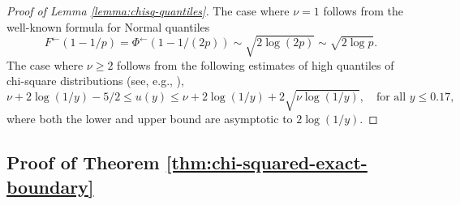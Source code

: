\begin{proof}[Proof of Lemma \ref{lemma:chisq-quantiles}]
The case where $\nu=1$ follows from the well-known formula for Normal quantiles 
$$
F^\leftarrow(1 - 1/p) = \Phi^\leftarrow(1-1/(2p))\sim\sqrt{2\log{(2p)}}\sim\sqrt{2\log{p}}.
$$
The case where $\nu\ge2$ follows from the following estimates of high quantiles of chi-square distributions (see, e.g., \citep{inglot2010inequalities}),
$$
    \nu +  2\log(1/y) -5/2 \le u(y) \le \nu +  2\log(1/y) + 2\sqrt{\nu\log(1/y)}, \quad \text{for all }y\le0.17,
$$
where both the lower and upper bound are asymptotic to $2\log(1/y)$.
\end{proof}


\subsection{Proof of Theorem \ref{thm:chi-squared-exact-boundary}}
\label{subsec:proof-chi-squared-exact-boundary}

